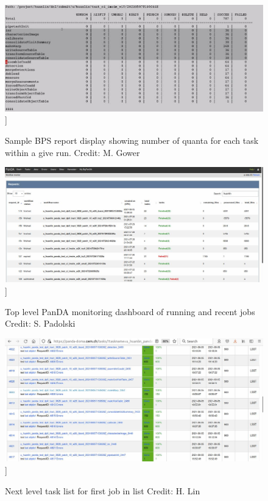 \documentclass[DM,authoryear,toc]{lsstdoc}
\begin{document}
\begin{figure}
\includegraphics[width=\textwidth]{bpsreport.jpg}]
\caption{Sample BPS report display showing number of quanta for each task within a give run.
Credit: M. Gower}
\end{figure}

\begin{figure}
\includegraphics[width=\textwidth]{pandadash0.jpg}]
\caption{Top level PanDA monitoring dashboard of running and recent jobs
Credit: S. Padolski}
\end{figure}

\begin{figure}
\includegraphics[width=\textwidth]{tasks1.jpg}]
\caption{Next level task list for first job in list
Credit: H. Lin}
\end{figure}
\end{document}
